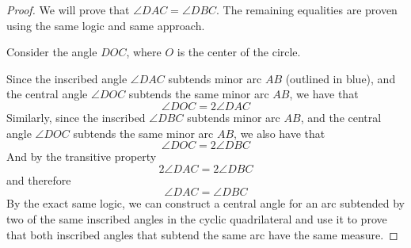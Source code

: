\begin{proof}
We will prove that $\angle DAC = \angle DBC$. The remaining equalities are proven using the same logic and same approach.

Consider the angle $DOC$, where $O$ is the center of the circle. 

\begin{center}
\end{center}

Since the inscribed angle $\angle DAC$ subtends minor arc $AB$ (outlined in blue), and the central angle $\angle DOC$ subtends the same minor arc $AB$, we have that 
\[
\angle DOC = 2 \angle DAC
\]
Similarly, since the inscribed $\angle DBC$ subtends minor arc $AB$, and the central angle $\angle DOC$ subtends the same minor arc $AB$, we also have that
\[
\angle DOC = 2\angle DBC
\]
And by the transitive property
\[
2 \angle DAC = 2\angle DBC
\]
and therefore
\[
\angle DAC = \angle DBC
\]
By the exact same logic, we can construct a central angle for an arc subtended by two of the same inscribed angles in the cyclic quadrilateral and use it to prove that both inscribed angles that subtend the same arc have the same measure.
\end{proof}

